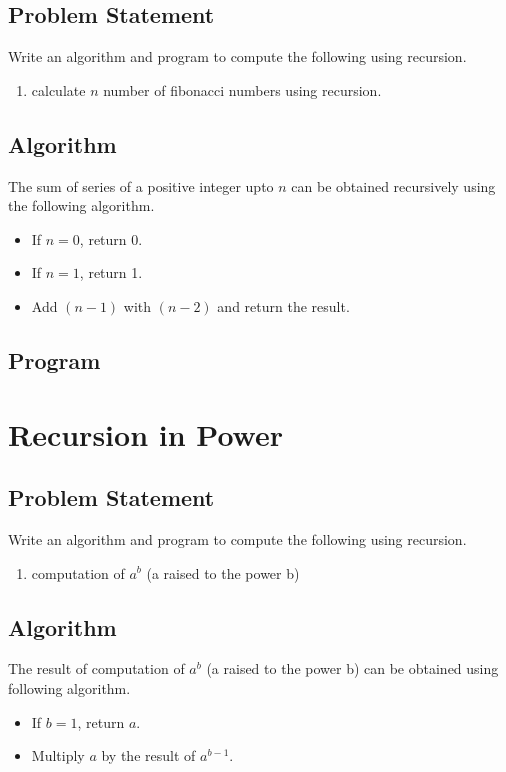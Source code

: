 \documentclass[11pt]{report}
\begin{document}
\section{Problem Statement}
Write an algorithm and program to compute the following using recursion.
\begin{enumerate}
  \item calculate $n$ number of fibonacci numbers using recursion.
\end{enumerate}
\section{Algorithm}
The sum of series of a positive integer upto $n$ can be obtained recursively using the following algorithm.
\begin{itemize}
\item If $n=0$, return 0.
\item If $n=1$, return 1.
\item Add $(n-1)$ with $(n-2)$ and return the result. 
\end{itemize}

\section{Program}
        

\chapter{Recursion in Power}
\section{Problem Statement}
Write an algorithm and program to compute the following using recursion.
\begin{enumerate}
  \item computation of $a^b$ (a raised to the power b)
\end{enumerate}
\section{Algorithm}
The result of computation of $a^b$ (a raised to the power b) can be obtained using following algorithm.
\begin{itemize}
\item If $b = 1$, return $a$.
\item Multiply $a$ by the result of $a^{b-1}$.
\end{itemize}
\end{document}
